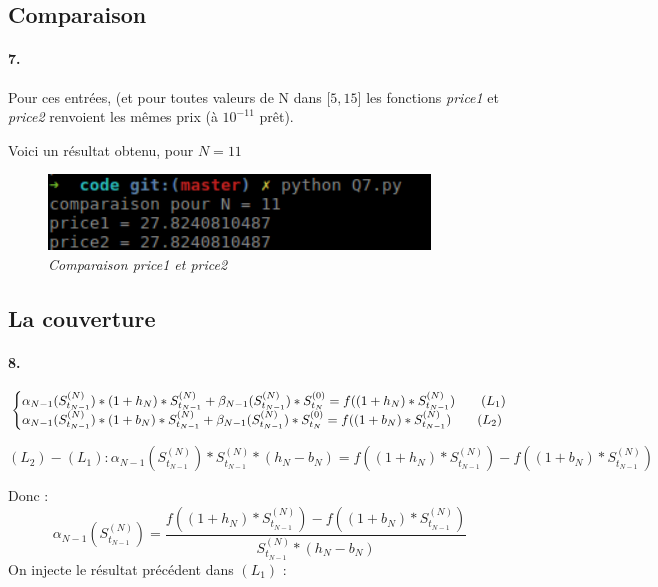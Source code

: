 \documentclass[10pt]{article}
\makeatletter
\newenvironment{sistema}%
{\left\lbrace\begin{array}{@{}l@{}}}%
  {\end{array}\right.}
\makeatother
\begin{document}
  \subsection{Comparaison}
  \paragraph{7.}
  Pour ces entrées, (et pour toutes valeurs de N dans $\mathbb{[}5, 15\mathbb{]}$ les fonctions \textit{price1} et \textit{price2}
  renvoient les mêmes prix (à $10^{-11}$ prêt).
  
  Voici un résultat obtenu, pour $N=11$
    \begin{figure}[H]
      \begin{center}
	\includegraphics[height=2cm,keepaspectratio]{./images/q7.png}
      \end{center}
      \caption{\textit{Comparaison price1 et price2}}
      \label{q7}
    \end{figure}
    
  \subsection{La couverture}
  \paragraph{8.}
  $$
  \begin{sistema}
    \alpha_{N-1}(S^{(N)}_{t_{N-1}})*(1+h_N)*S^{(N)}_{t_{N-1}} + \beta_{N-1} (S^{(N)}_{t_{N-1}})*S^{(0)}_{t_{N}}=f( (1+h_N)*S^{(N)}_{t_{N-1}}) \quad \quad (L_1)\\
    \alpha_{N-1}(S^{(N)}_{t_{N-1}})*(1+b_N)*S^{(N)}_{t_{N-1}} + \beta_{N-1} (S^{(N)}_{t_{N-1}})*S^{(0)}_{t_{N}}=f( (1+b_N)*S^{(N)}_{t_{N-1}}) \quad \quad (L_2)
  \end{sistema}
  $$
  
  $$
  (L_2) - (L_1) : \alpha_{N-1}(S^{(N)}_{t_{N-1}}) * S^{(N)}_{t_{N-1}} * (h_N - b_N) = f( (1+h_N)*S^{(N)}_{t_{N-1}}) - f( (1+b_N)*S^{(N)}_{t_{N-1}})
  $$
  
  Donc :
  $$
  \boxed{\alpha_{N-1}(S^{(N)}_{t_{N-1}}) = \frac{f( (1+h_N)*S^{(N)}_{t_{N-1}}) - f( (1+b_N)*S^{(N)}_{t_{N-1}})}{S^{(N)}_{t_{N-1}} * (h_N - b_N)}}
  $$
  \newline
  \newline
  On injecte le résultat précédent dans $(L_1)$ :
  
\end{document}
